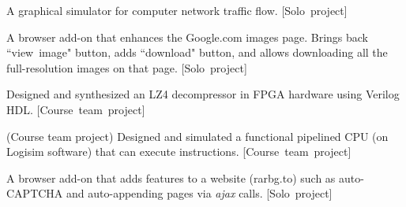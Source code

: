 



\divider

A graphical simulator for computer network traffic flow. \small{[Solo~project]}\\

\divider

A browser add-on that enhances the Google.com images page. Brings back ``view~image" button, adds ``download" button, and allows downloading all the full-resolution images on that page. \small{[Solo~project]}\\

\divider

Designed and synthesized an LZ4 decompressor in FPGA hardware using Verilog HDL. \small{[Course~team~project]}\\

\divider

(Course team project) Designed and simulated a functional pipelined CPU (on Logisim software) that can execute instructions. \small{[Course~team~project]}\\

\divider

A browser add-on that adds features to a website (rarbg.to) such as auto-CAPTCHA and auto-appending pages via \textit{ajax} calls. \small{[Solo~project]}\\

\cvproject{}